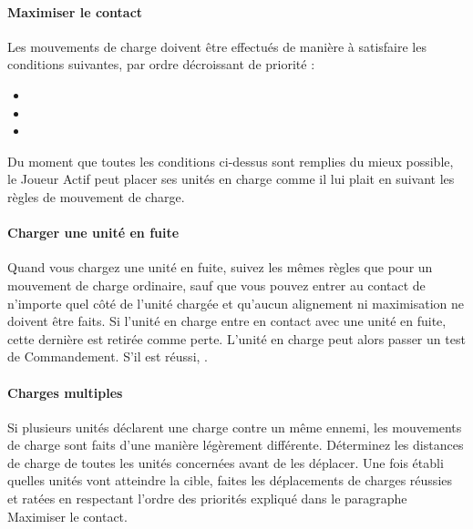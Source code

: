 \paragraph{Maximiser le contact}

Les mouvements de charge doivent être effectués de manière à satisfaire les conditions suivantes, par ordre décroissant de priorité :

\begin{itemize}[label={-}]
\item {}
\item {}
\item {}
\end{itemize}

Du moment que toutes les conditions ci-dessus sont remplies du mieux possible, le Joueur Actif peut placer ses unités en charge comme il lui plait en suivant les règles de mouvement de charge.

\paragraph{Charger une unité en fuite}

Quand vous chargez une unité en fuite, suivez les mêmes règles que pour un mouvement de charge ordinaire, sauf que vous pouvez entrer au contact de n'importe quel côté de l'unité chargée et qu'aucun alignement ni maximisation ne doivent être faits. Si l'unité en charge entre en contact avec une unité en fuite, cette dernière est retirée comme perte. L'unité en charge peut alors passer un test de Commandement. S'il est réussi, .

\paragraph{Charges multiples}

Si plusieurs unités déclarent une charge contre un même ennemi, les mouvements de charge sont faits d'une manière légèrement différente. Déterminez les distances de charge de toutes les unités concernées avant de les déplacer. Une fois établi quelles unités vont atteindre la cible, faites les déplacements de charges réussies et ratées en respectant l'ordre des priorités expliqué dans le paragraphe Maximiser le contact.

